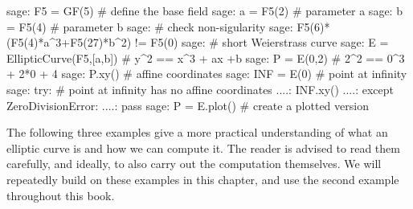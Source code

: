 \begin{sagecommandline}
sage: F5 = GF(5) # define the base field
sage: a = F5(2) # parameter a
sage: b = F5(4) # parameter b
sage: # check non-sigularity
sage: F5(6)*(F5(4)*a^3+F5(27)*b^2) != F5(0)
sage: # short Weierstrass curve 
sage: E = EllipticCurve(F5,[a,b]) # y^2 == x^3 + ax +b 
sage: P = E(0,2) # 2^2 == 0^3 + 2*0 + 4
sage: P.xy() # affine coordinates
sage: INF = E(0) # point at infinity
sage: try: 	# point at infinity has no affine coordinates
....:     INF.xy()
....: except ZeroDivisionError:
....:     pass
sage: P = E.plot() # create a plotted version 
\end{sagecommandline}
The following three examples give a more practical understanding of what an elliptic curve is and how we can compute it. The reader is advised to read them carefully, and ideally, to also carry out the computation themselves. We will repeatedly build on these examples in this chapter, and use the second example throughout this book.
